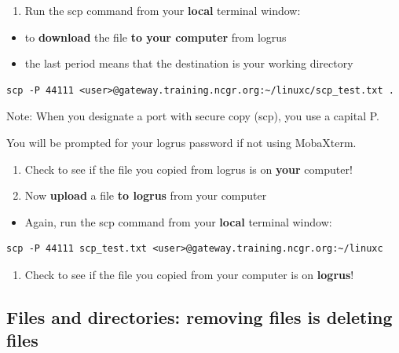 \documentclass[
]{book}
\providecommand{\tightlist}{%
  \setlength{\itemsep}{0pt}\setlength{\parskip}{0pt}}
\begin{document}
\begin{enumerate}
\def\labelenumi{\arabic{enumi})}
\setcounter{enumi}{2}
\tightlist
\item
  Run the scp command from your \textbf{local} terminal window:
\end{enumerate}

\begin{itemize}
\tightlist
\item
  to \textbf{download} the file \textbf{to your computer} from logrus
\item
  the last period means that the destination is your working directory
\end{itemize}

\begin{verbatim}
scp -P 44111 <user>@gateway.training.ncgr.org:~/linuxc/scp_test.txt .
\end{verbatim}

Note: When you designate a port with secure copy (scp), you use a capital P.

You will be prompted for your logrus password if not using MobaXterm.

\begin{enumerate}
\def\labelenumi{\arabic{enumi})}
\setcounter{enumi}{3}
\item
  Check to see if the file you copied from logrus is on \textbf{your} computer!
\item
  Now \textbf{upload} a file \textbf{to logrus} from your computer
\end{enumerate}

\begin{itemize}
\tightlist
\item
  Again, run the scp command from your \textbf{local} terminal window:
\end{itemize}

\begin{verbatim}
scp -P 44111 scp_test.txt <user>@gateway.training.ncgr.org:~/linuxc
\end{verbatim}

\begin{enumerate}
\def\labelenumi{\arabic{enumi})}
\setcounter{enumi}{5}
\tightlist
\item
  Check to see if the file you copied from your computer is on \textbf{logrus}!
\end{enumerate}

\hypertarget{files-and-directories-removing-files-is-deleting-files}{%
\subsection{Files and directories: removing files is deleting files}\label{files-and-directories-removing-files-is-deleting-files}}
\end{document}
